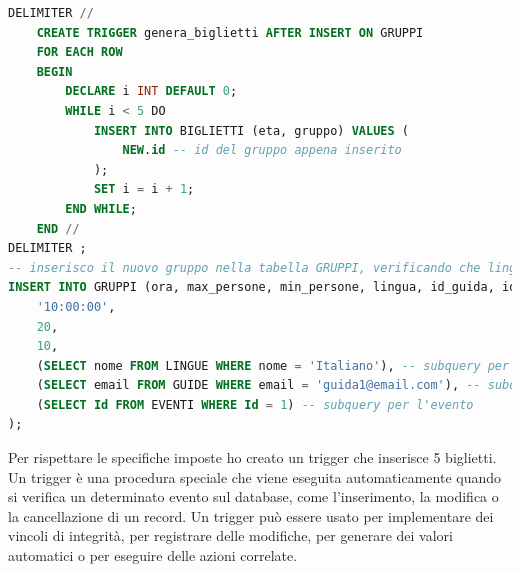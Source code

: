 \documentclass[a4paper,12pt]{report}
\begin{document}
\begin{lstlisting}[style=codeStyle,language=SQL,caption={operazione \ref{op:aggiuntaGruppo}}]
DELIMITER //
	CREATE TRIGGER genera_biglietti AFTER INSERT ON GRUPPI
	FOR EACH ROW
	BEGIN
	    DECLARE i INT DEFAULT 0;
	    WHILE i < 5 DO
	        INSERT INTO BIGLIETTI (eta, gruppo) VALUES (
	            NEW.id -- id del gruppo appena inserito
	        );
	        SET i = i + 1;
	    END WHILE;
	END //
DELIMITER ;
-- inserisco il nuovo gruppo nella tabella GRUPPI, verificando che lingua, id_guida e id_evento siano presenti nelle rispettive tabelle
INSERT INTO GRUPPI (ora, max_persone, min_persone, lingua, id_guida, id_evento) VALUES (
    '10:00:00',
    20,
    10,
    (SELECT nome FROM LINGUE WHERE nome = 'Italiano'), -- subquery per la lingua
    (SELECT email FROM GUIDE WHERE email = 'guida1@email.com'), -- subquery per la guida
    (SELECT Id FROM EVENTI WHERE Id = 1) -- subquery per l'evento
);
\end{lstlisting}
Per rispettare le specifiche imposte ho creato un trigger che inserisce 5 biglietti.
Un trigger è una procedura speciale che viene eseguita automaticamente quando si
verifica un determinato evento sul database, come l’inserimento, la modifica o
la cancellazione di un record. Un trigger può essere usato per implementare dei
vincoli di integrità, per registrare delle modifiche, per generare dei valori
automatici o per eseguire delle azioni correlate.
\end{document}
